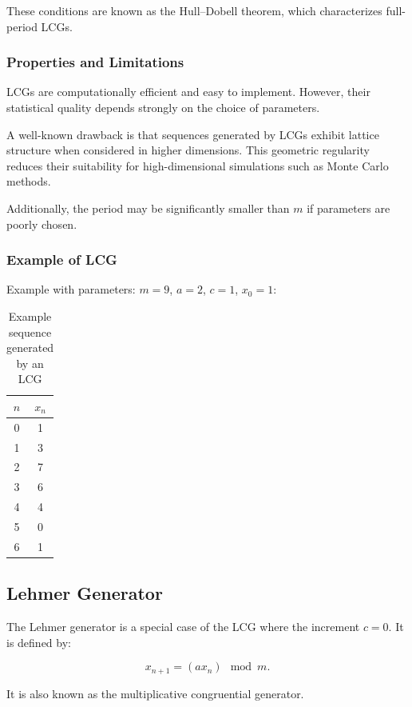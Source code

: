 These conditions are known as the Hull--Dobell theorem, which characterizes full-period LCGs.

\subsubsection{Properties and Limitations}

LCGs are computationally efficient and easy to implement. However, their statistical quality depends strongly on the choice of parameters.

A well-known drawback is that sequences generated by LCGs exhibit lattice structure when considered in higher dimensions. This geometric regularity reduces their suitability for high-dimensional simulations such as Monte Carlo methods.

Additionally, the period may be significantly smaller than $m$ if parameters are poorly chosen.

\subsubsection{Example of LCG}

Example with parameters:
$m = 9$, $a = 2$, $c = 1$, $x_0 = 1$:

\begin{table}[h]
\centering
\small
\begin{tabular}{|c|c|}
\hline
$n$ & $x_n$ \\
\hline
0 & 1 \\
1 & 3 \\
2 & 7 \\
3 & 6 \\
4 & 4 \\
5 & 0 \\
6 & 1 \\
\hline
\end{tabular}
\caption{Example sequence generated by an LCG}
\end{table}

\subsection{Lehmer Generator}

The Lehmer generator is a special case of the LCG where the increment $c = 0$. It is defined by:

$$
x_{n+1} = (a x_n) \mod m.
$$

It is also known as the multiplicative congruential generator.

